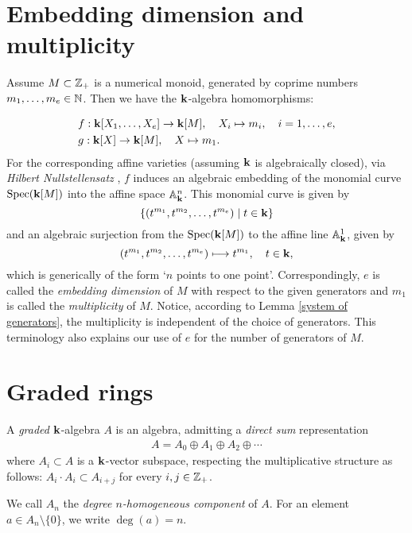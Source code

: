 \section{Embedding dimension and multiplicity}\label{terminology}
Assume $M\subset\mathbb Z_+$ is a numerical monoid, generated by coprime numbers $m_1,\ldots,m_e\in\mathbb N$. Then we have the $\mathbf{k}$-algebra homomorphisms:

\begin{align*}
&f:\mathbf{k}[X_1,\ldots,X_e]\to\mathbf{k}[M],\quad X_i\mapsto m_i,\quad i=1,\ldots,e,\\
&g:\mathbf{k}[X]\to\mathbf{k}[M],\quad X\mapsto m_1.
\end{align*}
For the corresponding affine varieties (assuming $\mathbf{k}$ is algebraically closed), via \emph{Hilbert Nullstellensatz} \cite[Chapter 7]{Atiyah}, $f$ induces an algebraic embedding of the monomial curve $\operatorname{Spec}(\mathbf{k}[M])$ into the affine space $\mathbb A^n_{\mathbf{k}}$. This monomial curve is given by 
\[
	\{(t^{m_1}, t^{m_2}, \ldots, t^{m_e}) \mid  t \in \mathbf{k} \}
\]
 and an algebraic surjection from the $\operatorname{Spec}(\mathbf{k}[M])$ to the affine line $\mathbb A_{\mathbf{k}}^1$, given by 
\[
	(t^{m_1}, t^{m_2}, \ldots, t^{m_e}) \longmapsto t^{m_1}, \ \ \ t \in \mathbf{k},
\]
which is generically of the form `$n$ points to one point\rq{}. Correspondingly, $e$ is called the \emph{embedding dimension} of $M$ with respect to the given generators and $m_1$ is called the \emph{multiplicity} of $M$. Notice, according to Lemma \ref{system of generators}, the multiplicity is independent of the choice of generators. This terminology also explains our use of $e$ for the number of generators of $M$.

\section{Graded rings}
A \emph{graded} $\mathbf{k}$-algebra $A$ is an algebra, admitting a \emph{direct sum} representation
\begin{align*}
A=A_0\oplus A_1\oplus A_2\oplus\cdots
\end{align*}
where $A_i\subset A$ is a $\mathbf{k}$-vector subspace, respecting the multiplicative structure as follows: $A_i\cdot A_i\subset A_{i+j}$ for every $i,j\in\mathbb Z_+$.

We call $A_n$ the \emph{degree $n$-homogeneous component} of $A$. For an element $a\in A_n\setminus\{0\}$, we write $\deg(a)=n$.

